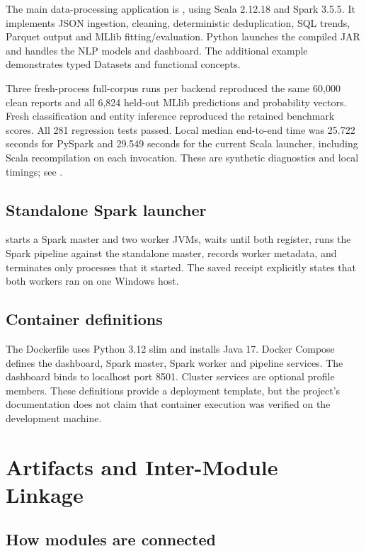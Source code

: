 \documentclass[12pt,a4paper]{report}
\begin{document}
The main data-processing application is , using Scala 2.12.18 and Spark 3.5.5. It implements JSON ingestion, cleaning, deterministic deduplication, SQL trends, Parquet output and MLlib fitting/evaluation. Python launches the compiled JAR and handles the NLP models and dashboard. The additional  example demonstrates typed Datasets and functional concepts.

Three fresh-process full-corpus runs per backend reproduced the same 60,000 clean reports and all 6,824 held-out MLlib predictions and probability vectors. Fresh classification and entity inference reproduced the retained benchmark scores. All 281 regression tests passed. Local median end-to-end time was 25.722 seconds for PySpark and 29.549 seconds for the current Scala launcher, including Scala recompilation on each invocation. These are synthetic diagnostics and local timings; see .

\section{Standalone Spark launcher}

 starts a Spark master and two worker JVMs, waits until both register, runs the Spark pipeline against the standalone master, records worker metadata, and terminates only processes that it started. The saved receipt explicitly states that both workers ran on one Windows host.

\section{Container definitions}

The Dockerfile uses Python 3.12 slim and installs Java 17. Docker Compose defines the dashboard, Spark master, Spark worker and pipeline services. The dashboard binds to localhost port 8501. Cluster services are optional profile members. These definitions provide a deployment template, but the project's documentation does not claim that container execution was verified on the development machine.

\chapter{Artifacts and Inter-Module Linkage}

\section{How modules are connected}
\end{document}
